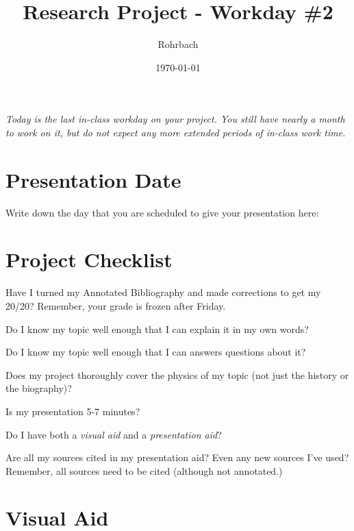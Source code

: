\documentclass[10pt]{exam}
\title{Research Project - Workday \#2}
\author{Rohrbach}
\date{\today}
\begin{document}
\maketitle

\noindent
\emph{Today is the last in-class workday on your project.  You still have nearly a month to work on it, but do not expect any more extended periods of in-class work time.}

\section*{Presentation Date}

Write down the day that you are scheduled to give your presentation here: \fillin[][15em]

\section*{Project Checklist}

\begin{checkboxes}

  \choice 
    Have I turned my Annotated Bibliography and made corrections to get my 20/20?  Remember, your grade is frozen after Friday.

  \choice
    Do I know my topic well enough that I can explain it in my own words?

  \choice
    Do I know my topic well enough that I can answers questions about it?

  \choice
    Does my project thoroughly cover the physics of my topic (not just the history or the biography)?

  \choice
    Is my presentation 5-7 minutes?

  \choice
    Do I have both a \emph{visual aid} and a \emph{presentation aid}?

  \choice
    Are all my sources cited in my presentation aid?  Even any new sources I've used?  Remember, all sources need to be cited (although not annotated.)

\end{checkboxes}

\section*{Visual Aid}
\end{document}

